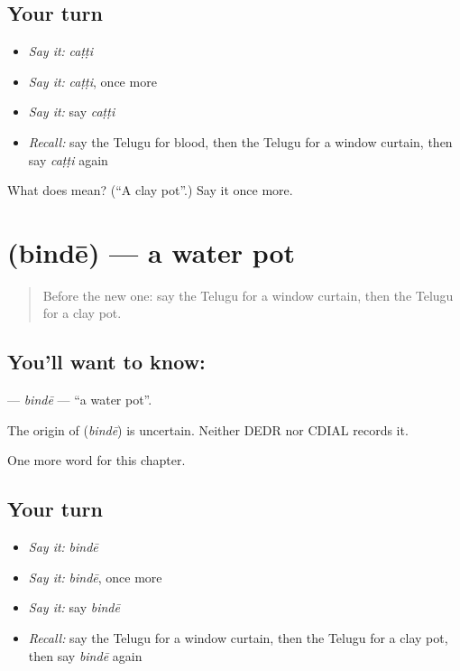 \subsection*{Your turn}
\begin{itemize}
\raggedright
  \item \emph{Say it:} \emph{caṭṭi}
  \item \emph{Say it:} \emph{caṭṭi}, once more
  \item \emph{Say it:} say \emph{caṭṭi}
  \item \emph{Recall:} say the Telugu for blood, then the Telugu for a window curtain, then say \emph{caṭṭi} again
\end{itemize}

\begin{tcolorbox}[breakable,colback=teal!4,colframe=teal!35!black,title={Before you move on}]
What does  mean? (\textquotedblleft{}A clay pot\textquotedblright{}.) Say it once more.
\end{tcolorbox}
\section[\texorpdfstring{\te{బిందె} (bindē)}{బిందె (bindē)}]{ (bindē) — a water pot}

\label{lesson:TE-C129-binde}



\begin{quote}
Before the new one: say the Telugu for a window curtain, then the Telugu for a clay pot.
\end{quote}

\subsection*{You'll want to know: }
\textbf{} — \emph{bindē} — \textquotedblleft{}a water pot\textquotedblright{}.

\begin{cousinweb}
The origin of \textbf{} (\emph{bindē}) is uncertain. Neither DEDR nor CDIAL records it.
\end{cousinweb}

\begin{grammarlens}[title={What you've built}]
One more word for this chapter.
\end{grammarlens}

\subsection*{Your turn}
\begin{itemize}
\raggedright
  \item \emph{Say it:} \emph{bindē}
  \item \emph{Say it:} \emph{bindē}, once more
  \item \emph{Say it:} say \emph{bindē}
  \item \emph{Recall:} say the Telugu for a window curtain, then the Telugu for a clay pot, then say \emph{bindē} again
\end{itemize}

